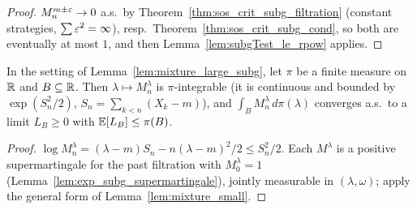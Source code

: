 \begin{proof}
  \leanok
  $M^{m\pm\varepsilon}_n \to 0$ a.s.\ by Theorem~\ref{thm:sos_crit_subg_filtration} (constant
  strategies, $\sum \varepsilon^2 = \infty$), resp.\ Theorem~\ref{thm:sos_crit_subg_cond}, so both are
  eventually at most $1$, and then Lemma~\ref{lem:subgTest_le_rpow} applies.
\end{proof}

\begin{lemma}
  \label{lem:mixture_small_subg}
  \leanok
  In the setting of Lemma~\ref{lem:mixture_large_subg}, let $\pi$ be a finite measure on $\mathbb{R}$ and
  $B \subseteq \mathbb{R}$. Then $\lambda \mapsto M^\lambda_n$ is $\pi$-integrable (it is continuous and
  bounded by $\exp(S_n^2/2)$, $S_n = \sum_{k<n} (X_k - m)$), and $\int_B M^\lambda_n \,
  d\pi(\lambda)$ converges a.s.\ to a limit $L_B \ge 0$ with $\mathbb{E}[L_B] \le \pi(B)$.
\end{lemma}

\begin{proof}
  \leanok
  $\log M^\lambda_n = (\lambda - m) S_n - n (\lambda - m)^2 / 2 \le S_n^2/2$. Each $M^\lambda$ is a
  positive supermartingale for the past filtration with $M^\lambda_0 = 1$
  (Lemma~\ref{lem:exp_subg_supermartingale}), jointly measurable in $(\lambda, \omega)$; apply the
  general form of Lemma~\ref{lem:mixture_small}.
\end{proof}
